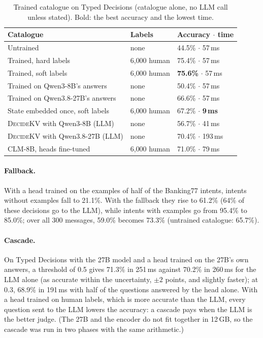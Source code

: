 \documentclass[11pt]{article}
\newcommand{\dkv}{\textsc{DecideKV}}
\newcommand{\ms}{\,ms}
\begin{document}
\begin{table}[t]
\centering\small
\caption{Trained catalogue on Typed Decisions (catalogue alone, no LLM call unless stated). Bold: the best accuracy and the lowest time.}\label{tab:typed}
\begin{tabular}{lll}
\toprule
Catalogue & Labels & Accuracy $\cdot$ time \\
\midrule
Untrained & none & 44.5\% $\cdot$ 57\ms \\
Trained, hard labels & 6{,}000 human & 75.4\% $\cdot$ 57\ms \\
Trained, soft labels & 6{,}000 human & \textbf{75.6\%} $\cdot$ 57\ms \\
Trained on Qwen3-8B's answers & none & 50.4\% $\cdot$ 57\ms \\
Trained on Qwen3.8-27B's answers & none & 66.6\% $\cdot$ 57\ms \\
State embedded once, soft labels & 6{,}000 human & 67.2\% $\cdot$ \textbf{9\ms} \\
\midrule
\dkv{} with Qwen3-8B (LLM) & none & 56.7\% $\cdot$ 41\ms \\
\dkv{} with Qwen3.8-27B (LLM) & none & 70.4\% $\cdot$ 193\ms \\
CLM-8B, heads fine-tuned & 6{,}000 human & 71.0\% $\cdot$ 79\ms \\
\bottomrule
\end{tabular}
\end{table}

\paragraph{Fallback.} With a head trained on the examples of half of the Banking77 intents, intents without examples
fall to 21.1\%. With the fallback they rise to 61.2\% (64\% of these decisions go to the LLM), while intents with
examples go from 95.4\% to 85.0\%; over all 300 messages, 59.0\% becomes 73.3\% (untrained catalogue: 65.7\%).

\paragraph{Cascade.} On Typed Decisions with the 27B model and a head trained on the 27B's own answers, a threshold
of 0.5 gives 71.3\% in 251\ms{} against 70.2\% in 260\ms{} for the LLM alone (as accurate within the
uncertainty, $\pm 2$ points, and slightly faster); at 0.3, 68.9\% in 191\ms{} with half of the questions answered by
the head alone. With a head trained on human labels, which is more accurate than the
LLM, every question sent to the LLM lowers the accuracy: a cascade pays when the LLM is the better judge. (The 27B and
the encoder do not fit together in 12\,GB, so the cascade was run in two phases with the same arithmetic.)
\end{document}
